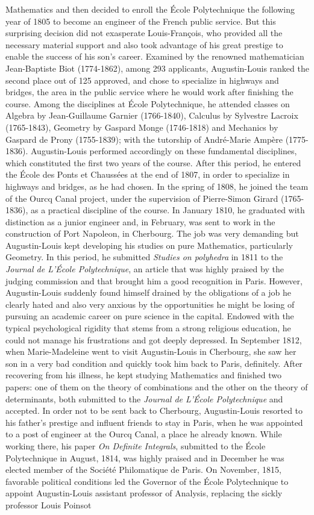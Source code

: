 Mathematics and then decided to enroll the \'Ecole Polytechnique the following year of 1805 to become an engineer of the French public service. But this surprising decision did not exasperate Louis-Fran\c{c}ois, who provided all the necessary material support and also took advantage of his great prestige to enable the success of his son's career. Examined by the renowned mathematician Jean-Baptiste Biot (1774-1862), among 293 applicants, Augustin-Louis ranked the second place out of 125 approved, and chose to specialize in highways and bridges, the area in the public service where he would work after finishing the course. Among the disciplines at \'Ecole Polytechnique, he attended classes on Algebra by Jean-Guillaume Garnier (1766-1840), Calculus by Sylvestre Lacroix (1765-1843), Geometry by Gaspard Monge (1746-1818) and Mechanics by Gaspard de Prony (1755-1839); with the tutorship of Andr\'e-Marie Amp\`ere (1775-1836). Augustin-Louis performed accordingly on these fundamental disciplines, which constituted the first two years of the course. After this period, he entered the \'Ecole des Ponts et Chauss\'ees at the end of 1807, in order to specialize in highways and bridges, as he had chosen. In the spring of 1808, he joined the team of the Ourcq Canal project, under the supervision of Pierre-Simon Girard (1765-1836), as a practical discipline of the course. In January 1810, he graduated with distinction as a junior engineer and, in February, was sent to work in the construction of Port Napoleon, in Cherbourg. The job was very demanding but Augustin-Louis kept developing his studies on pure Mathematics, particularly Geometry. In this period, he submitted \emph{Studies on polyhedra} in 1811 to the \emph{Journal de L'\'Ecole Polytechnique}, an article that was highly praised by the judging commission and that brought him a good recognition in Paris. However, Augustin-Louis suddenly found himself drained by the obligations of a job he clearly hated and also very anxious by the opportunities he might be losing of pursuing an academic career on pure science in the capital. Endowed with the typical psychological rigidity that stems from a strong religious education, he could not manage his frustrations and got deeply depressed. In September 1812, when Marie-Madeleine went to visit Augustin-Louis in Cherbourg, she saw her son in a very bad condition and quickly took him back to Paris, definitely. After recovering from his illness, he kept studying Mathematics and finished two papers: one of them on the theory of combinations and the other on the theory of determinants, both submitted to the \emph{Journal de L'\'Ecole Polytechnique} and accepted. In order not to be sent back to Cherbourg, Augustin-Louis resorted to his father's prestige and influent friends to stay in Paris, when he was appointed to a post of engineer at the Ourcq Canal, a place he already known. While working there, his paper \emph{On Definite Integrals}, submitted to the  \'Ecole Polytechnique in August, 1814, was highly praised and in December he was elected member of the Soci\'et\'e Philomatique de Paris. On November, 1815, favorable political conditions led the Governor of the \'Ecole Polytechnique to appoint Augustin-Louis assistant professor of Analysis, replacing the sickly professor Louis Poinsot 